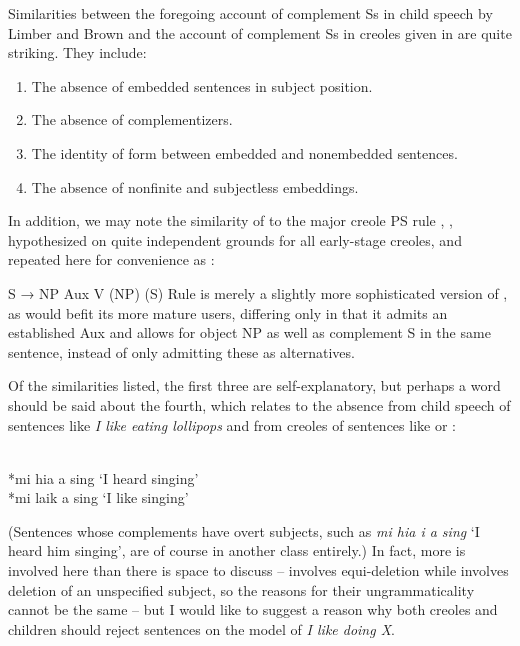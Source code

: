 Similarities between the foregoing account of complement Ss in child speech by Limber and Brown and the account of complement Ss in creoles given in  are quite striking. They include:

\begin{enumerate}
\item The absence of embedded sentences in subject position.
\item The absence of complementizers.
\item The identity of form between embedded and nonembedded sentences.
\item The absence of nonfinite and subjectless embeddings.
\end{enumerate}
 
In addition, we may note the similarity of  to the major creole PS rule , , hypothesized on quite independent grounds for all early-stage creoles, and repeated here for convenience as :

\ea\label{ex:3:40}
 S → NP Aux V (NP) (S) 
\z
Rule  is merely a slightly more sophisticated version of , as would befit its more mature users, differing only in that it admits an established Aux and allows for object NP as well as complement S in the same sentence, instead of only admitting these as alternatives.

Of the similarities listed, the first three are self-explanatory, but perhaps a word should be said about the fourth, which relates to the absence from child speech of sentences like \textit{I like eating lollipops} and from creoles of sentences like  or :

\ea\label{ex:3:41}
\ili{\langGC}{}{}\\
*mi hia a sing
\glt `I heard singing'
\z
\ea\label{ex:3:42}
\ili{\langGC}{}{}\\
*mi laik a sing
\glt `I like singing'
\z

\noindent (Sentences whose complements have overt subjects, such as \textit{mi hia i a sing} `I heard him singing', are of course in another class entirely.) In fact, more is involved here than there is space to discuss --  involves equi-deletion while  involves deletion of an unspecified subject, so the reasons for their ungrammaticality cannot be the same -- but I would like to suggest a reason why both creoles and children should reject sentences on the model of \textit{I like doing X}.

